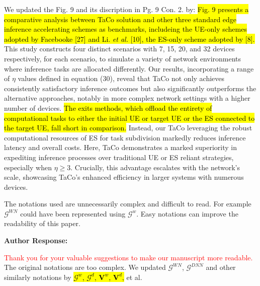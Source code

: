 \documentclass{ar2rc}
\newcommand{\highlight}[1]{\sethlcolor{yellow!50}\hl{#1}}
\begin{document}
We updated the Fig. 9 and its discription in Pg. 9 Con. 2. by:
\highlight{Fig. 9 presents a comparative analysis between TaCo solution and other three standard edge inference accelerating schemes as benchmarks, includeing the UE-only schemes adopted by Facebooke [27] and Li. \textit{et al.} [10], the ES-only scheme adopted by [8].} 
This study constructs four distinct scenarios with 7, 15, 20, and 32 devices respectively, for each scenario, to simulate a variety of network environments where inference tasks are allocated differently. 
Our results, incorporating a range of $\eta$ values defined in equation (30), reveal that TaCo not only achieves consistently satisfactory inference outcomes but also significantly outperforms the alternative approaches, notably in more complex network settings with a higher number of devices. \highlight{The exits methods, which offload the entirety of computational tasks to either the initial UE or target UE or the ES connected to the target UE, fall short in comparison.} Instead, our TaCo leveraging the robust computational resources of ES for task subdivision markedly reduces inference latency and overall costs.
Here, TaCo demonstrates a marked superiority in expediting inference processes over traditional UE or ES reliant strategies, especially when $\eta \geq 3$. Crucially, this advantage escalates with the network's scale, showcasing TaCo's enhanced efficiency in larger systems with numerous devices.

\begin{tcolorbox}[
   title={Reviewer 1: Comment 3},
   colback=gray!10,%
   colframe=black,%
   width=\linewidth,%
   arc=1mm, auto outer arc,
   boxrule=0.5pt,
]
The notations used are unnecessarily complex and difficult to read. For example $\mathcal{G}^{WN}$ could have been represented using $\mathcal{G}^{w}$. Easy notations can improve the readability of this paper.
\end{tcolorbox}
\textbf{Author Response:} 

\noindent \textcolor{red}{Thank you for your valuable suggestions to make our manuscript more readable.} The original notations are too complex. We updated $\mathcal{G}^{WN}$, $\mathcal{G}^{DNN}$ and other similarly notations by \highlight{$\mathcal{G}^{w}$, $\mathcal{G}^{d}$, $\mathbf{V}^{w}$, $\mathbf{V}^{d}$,} et al. 
\end{document}
